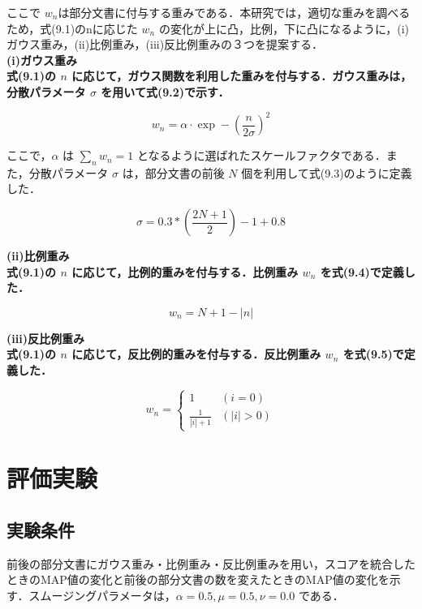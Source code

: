 ここで $w_n$は部分文書に付与する重みである．本研究では，適切な重みを調べるため，式(9.1)のnに応じた $w_n$ の変化が上に凸，比例，下に凸になるように，(i)ガウス重み，(ii)比例重み，(iii)反比例重みの３つを提案する．\\

\bf(i)ガウス重み \\

式(9.1)の $n$ に応じて，ガウス関数を利用した重みを付与する．ガウス重みは，分散パラメータ $\sigma$ を用いて式(9.2)で示す．

\begin{equation}
    w_n = \alpha⋅\exp⁡-(\frac{n}{2\sigma})^2
    \label{zengo2}
\end{equation}

ここで，$\alpha$ は $\sum_n w_n = 1$ となるように選ばれたスケールファクタである．また，分散パラメータ $\sigma$ は，部分文書の前後 $N$ 個を利用して式(9.3)のように定義した．

\begin{equation}
    \sigma = 0.3 * (\frac{2N+1}{2}) - 1 + 0.8
    \label{zengo3}
\end{equation}

\bf(ii)比例重み \\

式(9.1)の $n$ に応じて，比例的重みを付与する．比例重み $w_n$ を式(9.4)で定義した．

\begin{equation}
    w_n = N+1-|n|
    \label{zengo4}
\end{equation}

\bf(iii)反比例重み \\

式(9.1)の $n$ に応じて，反比例的重みを付与する．反比例重み $w_n$ を式(9.5)で定義した．

\begin{equation}
    w_n = 
    \begin{cases} 
        1 & (i = 0)\\ 
        \frac{1}{|i|+1} & (|i| > 0)
    \end{cases} 
    \label{zengo5}
\end{equation}

\section{評価実験}
\subsection{実験条件}
前後の部分文書にガウス重み・比例重み・反比例重みを用い，スコアを統合したときのMAP値の変化と前後の部分文書の数を変えたときのMAP値の変化を示す．スムージングパラメータは，$\alpha= 0.5, \mu= 0.5, \nu= 0.0$ である．

